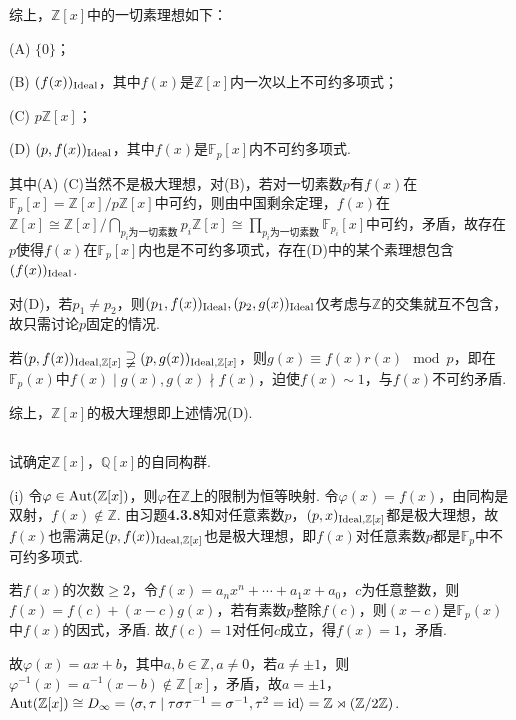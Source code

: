 综上，$\mathbb{Z}[x]$中的一切素理想如下：

(A) $\{0\}$；

(B) $(f(x))_{\operatorname{Ideal}}$，其中$f(x)$是$\mathbb{Z}[x]$内一次以上不可约多项式；

(C) $p\mathbb{Z}[x]$；

(D) $(p, f(x))_{\operatorname{Ideal}}$，其中$f(x)$是$\mathbb{F}_p[x]$内不可约多项式.

其中(A) (C)当然不是极大理想，对(B)，若对一切素数$p$有$f(x)$在$\mathbb{F}_p[x]=\mathbb{Z}[x]/p\mathbb{Z}[x]$中可约，则由中国剩余定理，$f(x)$在$\mathbb{Z}[x]\cong\mathbb{Z}[x]/\bigcap_{p_i\text{为一切素数}}p_i\mathbb{Z}[x]\cong\prod_{p_i\text{为一切素数}}\mathbb{F}_{p_i}[x]$中可约，矛盾，故存在$p$使得$f(x)$在$\mathbb{F}_p[x]$内也是不可约多项式，存在(D)中的某个素理想包含$(f(x))_{\operatorname{Ideal}}$.

对(D)，若$p_1\neq p_2$，则$(p_1, f(x))_{\operatorname{Ideal}}, (p_2, g(x))_{\operatorname{Ideal}}$仅考虑与$\mathbb{Z}$的交集就互不包含，故只需讨论$p$固定的情况.

若$(p, f(x))_{\operatorname{Ideal}, \mathbb{Z}[x]}\supsetneqq (p, g(x))_{\operatorname{Ideal}, \mathbb{Z}[x]}$，则$g(x)\equiv f(x)r(x)\mod p$，即在$\mathbb{F}_p(x)$中$f(x)\mid g(x), g(x)\nmid f(x)$，迫使$f(x)\sim 1$，与$f(x)$不可约矛盾.

综上，$\mathbb{Z}[x]$的极大理想即上述情况(D).

\subsection{}
试确定$\mathbb{Z}[x]$，$\mathbb{Q}[x]$的自同构群.

\jie (i) 令$\varphi\in\operatorname{Aut}(\mathbb{Z}[x])$，则$\varphi$在$\mathbb{Z}$上的限制为恒等映射. 令$\varphi(x)=f(x)$，由同构是双射，$f(x)\notin\mathbb{Z}$. 由{\heiti 习题}\textbf{4.3.8}知对任意素数$p$，$(p,x)_{\operatorname{Ideal}, \mathbb{Z}[x]}$都是极大理想，故$f(x)$也需满足$(p,f(x))_{\operatorname{Ideal}, \mathbb{Z}[x]}$也是极大理想，即$f(x)$对任意素数$p$都是$\mathbb{F}_p$中不可约多项式.

若$f(x)$的次数$\geq 2$，令$f(x)=a_nx^n+\cdots+a_1x+a_0$，$c$为任意整数，则$f(x)=f(c)+(x-c)g(x)$，若有素数$p$整除$f(c)$，则$(x-c)$是$\mathbb{F}_p(x)$中$f(x)$的因式，矛盾. 故$f(c)=1$对任何$c$成立，得$f(x)=1$，矛盾.

故$\varphi(x)=ax+b$，其中$a,b\in\mathbb{Z},a\neq 0$，若$a\neq \pm 1$，则$\varphi^{-1}(x)=a^{-1}(x-b)\notin\mathbb{Z}[x]$，矛盾，故$a=\pm 1$，
$\operatorname{Aut}(\mathbb{Z}[x])\cong D_{\infty}=\langle \sigma,\tau\mid \tau\sigma\tau^{-1}=\sigma^{-1}, \tau^2=\operatorname{id} \rangle=\mathbb{Z}\rtimes(\mathbb{Z}/2\mathbb{Z})$.

